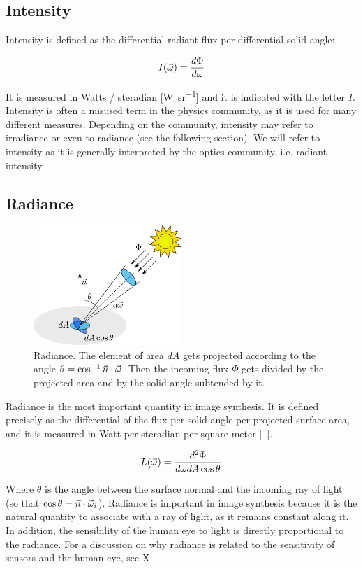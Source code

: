 \subsection{Intensity}
Intensity is defined as the differential radiant flux per differential solid angle:

$$
I(\vec{\omega}) = \frac{d \Phi}{d \omega}
$$

It is measured in Watts / steradian [\si{\watt\per\steradian}] and it is indicated with the letter $I$. Intensity is often a misused term in the physics community, as it is used for many different measures. Depending on the community, intensity may refer to irradiance or even to radiance (see the following section). We will refer to intensity as it is generally interpreted by the optics community, i.e. radiant intensity. 


\subsection{Radiance}


\begin{figure}[!ht]
\centering
\includegraphics[width=0.5\textwidth]{images/radiance.pdf}
\caption{Radiance. The element of area $dA$ gets projected according to the angle $\theta = \cos^{-1}{\vec{n} \cdot \vec{\omega}}$. Then the incoming flux $\Phi$ gets divided by the projected area and by the solid angle subtended by it.}
\label{fig:radiance}
\end{figure}


Radiance is the most important quantity in image synthesis. It is defined precisely as the differential of the flux per solid angle per projected surface area, and it is measured in Watt per steradian per square meter [\si{\watt\per\steradian\meter\square}].

$$
L(\vec{\omega}) = \frac{d^2 \Phi}{d\omega dA \cos \theta}
$$

Where $\theta$ is the angle between the surface normal and the incoming ray of light (so that $\cos\theta = \vec{n} \cdot \vec{\omega}_i$). Radiance is important in image synthesis because it is the natural quantity to associate with a ray of light, as it remains constant along it. In addition, the sensibility of the human eye to light is directly proportional to the radiance. For a discussion on why radiance is related to the sensitivity of sensors and the human eye, see X.

